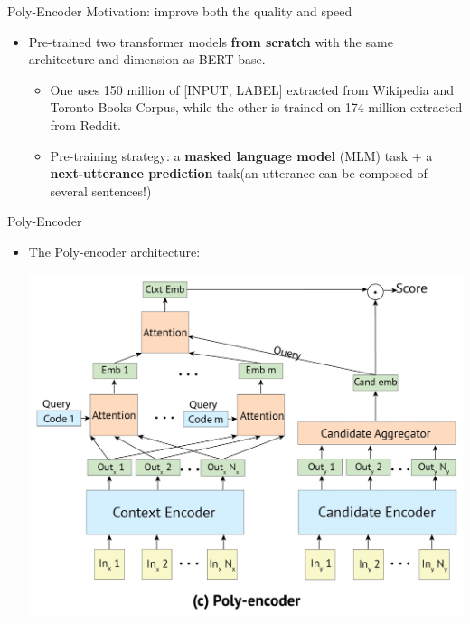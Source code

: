 \documentclass{beamer}
\begin{document}
\begin{frame}{Poly-Encoder}
    Motivation: improve both the quality and speed
    \begin{itemize}
        \item Pre-trained two transformer models \textbf{from scratch} with the same architecture and dimension as BERT-base.
        \begin{itemize}
            \item One uses 150 million of [INPUT, LABEL] extracted from Wikipedia and Toronto Books Corpus, while the other is trained on 174 million extracted from Reddit.
            \item Pre-training strategy: a \textbf{masked language model} (MLM) task + a \textbf{next-utterance prediction} task(an utterance can be composed of several sentences!)
        \end{itemize}


    \end{itemize}
\end{frame}

\begin{frame}{Poly-Encoder}
    \begin{itemize}
        \item The Poly-encoder architecture:
        \begin{center}
            \includegraphics[width=0.9\linewidth]{poly-encoder.png}
        \end{center}

    \end{itemize}
\end{frame}
\end{document}
